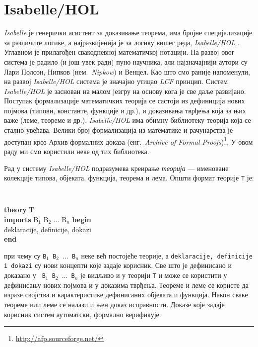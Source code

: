 
\section{Isabelle/HOL}

\emph{Isabelle} \cite{isabellepaulson1, isabellepaulson2} је генерички
асистент за доказивање теорема, има бројне специјализације за
различите логике, а најразвијенија је за логику вишег реда,
\emph{Isabelle/HOL} \cite{Isabelle}. Углавном је прилагођен
свакодневној математичкој нотацији. На развој овог система је радило
(и још увек ради) пуно научника, али најзначајнији аутори су Лари
Полсон, Нипков (нем.~\emph{Nipkow}) и Венцел. Као што смо раније
напоменули, на развој \emph{Isabelle/HOL} система је значајно утицао
\emph{LCF} принцип. Систем \emph{Isabelle/HOL} је заснован на малом
језгру на основу кога је све даље развијано.  Поступак формализације
математичких теорија се састоји из дефиниција нових појмова (типови,
константе, функције и др.), и доказивања тврђења која за њих важе
(леме, теореме и др.). \emph{Isabelle/HOL} има обимну библиотеку
теорија која се стално увећава. Велики број формализација из
математике и рачунарства је доступан кроз Архив формалних доказа
(енг.~\emph{Archive of Formal
  Proofs})\footnote{\url{http://afp.sourceforge.net/}}. У овом раду ми
смо користили неке од тих библиотека.

Рад у систему \emph{Isabelle/HOL} подразумева креирање \emph{теорија}
--- именоване колекције типова, објеката, функција, теорема и
лема. Општи формат теорије {\tt T} је:

\begin{small}
{\tt 
\begin{tabbing}
\textbf{theory} T \\
\textbf{imports} B$_1$ B$_2$ $\ldots$ B$_n$
\textbf{begin} \\
deklaracije, definicije, dokazi \\
\textbf{end}
\end{tabbing}
}
\end{small}

\noindent при чему су {\tt B$_1$ B$_2$ $\ldots$ B$_n$} неке већ
постојеће теорије, а {\tt deklaracije, definicije i dokazi} су нови
концепти које задаје корисник. Све што је дефинисано и доказано у {\tt
  B$_1$ B$_2$ $\ldots$ B$_n$} је видљиво и у теорији {\tt T} и може се
користити у дефинисању нових појмова и у доказима тврђења. Теореме и
леме се користе да изразе својства и карактеристике дефинисаних
објеката и функција. Након сваке теореме или леме се налази и њен
доказ исправности. Доказе које задаје корисник систем аутоматски,
формално верификује.


